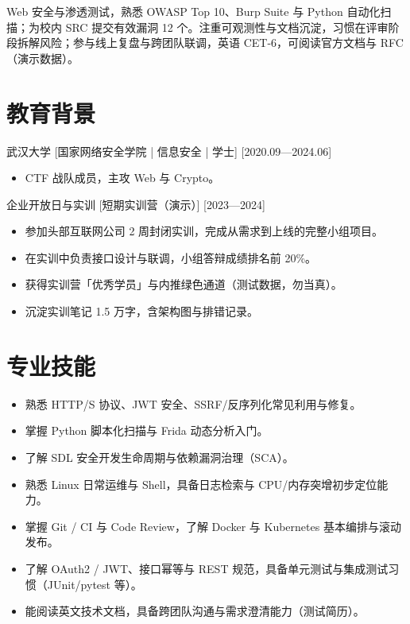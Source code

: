 \documentclass{resume-photo}
\begin{document}

\ResumeTitle

\noindent Web 安全与渗透测试，熟悉 OWASP Top 10、Burp Suite 与 Python 自动化扫描；为校内 SRC 提交有效漏洞 12 个。注重可观测性与文档沉淀，习惯在评审阶段拆解风险；参与线上复盘与跨团队联调，英语 CET-6，可阅读官方文档与 RFC（演示数据）。

\section{教育背景}
\ResumeItem
{武汉大学}
[\textnormal{国家网络安全学院 | 信息安全 | 学士}]
[2020.09—2024.06]

\begin{itemize}
  \item CTF 战队成员，主攻 Web 与 Crypto。
\end{itemize}


\ResumeItem
{企业开放日与实训}
[\textnormal{短期实训营（演示）}]
[2023—2024]

\begin{itemize}
  \item 参加头部互联网公司 2 周封闭实训，完成从需求到上线的完整小组项目。
  \item 在实训中负责接口设计与联调，小组答辩成绩排名前 20\%。
  \item 获得实训营「优秀学员」与内推绿色通道（测试数据，勿当真）。
  \item 沉淀实训笔记 1.5 万字，含架构图与排错记录。
\end{itemize}



\section{专业技能}
\begin{itemize}
  \item 熟悉 HTTP/S 协议、JWT 安全、SSRF/反序列化常见利用与修复。
  \item 掌握 Python 脚本化扫描与 Frida 动态分析入门。
  \item 了解 SDL 安全开发生命周期与依赖漏洞治理（SCA）。
  \item 熟悉 Linux 日常运维与 Shell，具备日志检索与 CPU/内存突增初步定位能力。
  \item 掌握 Git / CI 与 Code Review，了解 Docker 与 Kubernetes 基本编排与滚动发布。
  \item 了解 OAuth2 / JWT、接口幂等与 REST 规范，具备单元测试与集成测试习惯（JUnit/pytest 等）。
  \item 能阅读英文技术文档，具备跨团队沟通与需求澄清能力（测试简历）。
\end{itemize}
\end{document}
